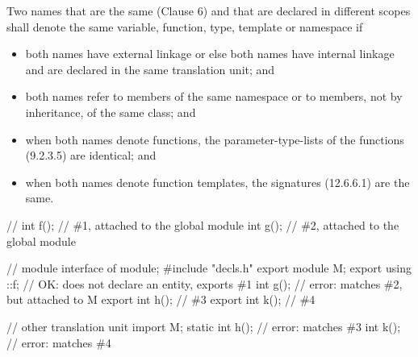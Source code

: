 \begin{std.txt}
  \pnum[10]
  \addtocounter{footnote}{1}
  Two
  names that are the same (Clause 6) and that are declared in different scopes
  shall denote the same variable, function, type, template or namespace if
  \begin{itemize}
    \item both names have external  linkage
      or else both names have internal linkage and are declared in
      the same translation unit; and

      \item both names refer to members of the same namespace or to members,
      not by inheritance, of the same class; and

      \item when both names denote functions, the parameter-type-lists of the
      functions (9.2.3.5) are identical; and

      \item when both names denote function templates, the signatures (12.6.6.1)
      are the same.
  \end{itemize}

  \pnum
  \color{addclr}
  \begin{example}
    \begin{codeblock}
      // 
      int f();            // \#1, attached to the global module
      int g();            // \#2, attached to the global module

      // module interface of 
      module;
      #include "decls.h"
      export module M;
      export using ::f;   // OK: does not declare an entity, exports \#1
      int g();            // error: matches \#2, but attached to M
      export int h();     // \#3
      export int k();     // \#4

      // other translation unit
      import M;
      static int h();     // error: matches \#3
      int k();            // error: matches \#4
    \end{codeblock}
  \end{example}
\end{std.txt}


